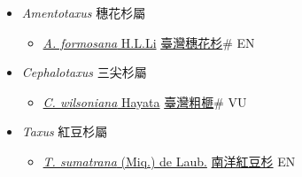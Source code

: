 
  \begin{itemize}
 \item[] \textit{Amentotaxus} 穗花杉屬
                    
  \begin{itemize}
        \item[] \href{http://www.theplantlist.org/tpl1.1/search?q=Amentotaxus+formosana}{\textit{A. formosana} H.L.Li}   \href{\detokenize{http://taibnet.sinica.edu.tw/chi/taibnet_species_list.php?T2=臺灣穗花杉&T2_new_value=true&fr=y}}{臺灣穗花杉}\# EN
  \end{itemize}
 \item[] \textit{Cephalotaxus} 三尖杉屬
                    
  \begin{itemize}
        \item[] \href{http://www.theplantlist.org/tpl1.1/search?q=Cephalotaxus+wilsoniana}{\textit{C. wilsoniana} Hayata}   \href{\detokenize{http://taibnet.sinica.edu.tw/chi/taibnet_species_list.php?T2=臺灣粗榧&T2_new_value=true&fr=y}}{臺灣粗榧}\# VU
  \end{itemize}
 \item[] \textit{Taxus} 紅豆杉屬
                    
  \begin{itemize}
        \item[] \href{http://www.theplantlist.org/tpl1.1/search?q=Taxus+sumatrana}{\textit{T. sumatrana} (Miq.) de Laub.}   \href{\detokenize{http://taibnet.sinica.edu.tw/chi/taibnet_species_list.php?T2=南洋紅豆杉&T2_new_value=true&fr=y}}{南洋紅豆杉} EN
  \end{itemize}
  \end{itemize}

